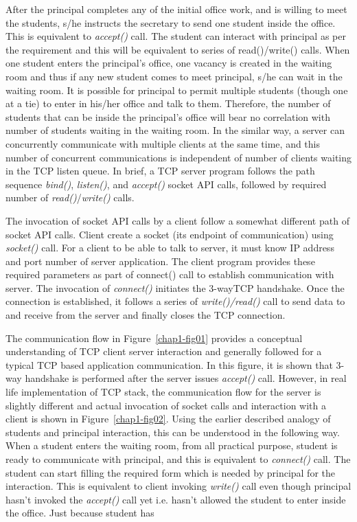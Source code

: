 \begin{multicols}{2}
After the principal completes any of the initial office work, and is willing to meet the students, s/he instructs the secretary to send one student inside the office. This is equivalent to \textit{accept()} call. The student can interact with principal as per the requirement and this will be equivalent to series of read()/write() calls. When one student enters the principal’s office, one vacancy is created in the waiting room and thus if any new student comes to meet principal, s/he can wait in the waiting room. It is possible for principal to permit multiple students (though one at a tie) to enter in his/her office and talk to them. Therefore, the number of students that can be inside the principal’s office will bear no correlation with number of students waiting in the waiting room. In the similar way, a server can concurrently communicate with multiple clients at the same time, and this number of concurrent communications is independent of number of clients waiting in the TCP listen queue. In brief, a TCP server program follows the path sequence \textit{bind()}, \textit{listen()}, and \textit{accept()} socket API calls, followed by required number of \textit{read()}/\textit{write()} calls. 

The invocation of socket API calls by a client follow a somewhat different path of socket API calls. Client create a socket (its endpoint of communication) using \textit{socket()} call. For a client to be able to talk to server, it must know IP address and port number of server application.  The client program provides these required parameters as part of connect() call to establish communication with server. The invocation of \textit{connect()} initiates the 3-wayTCP  handshake. Once the connection is established, it follows a series of \textit{write()/read()} call to send data to and receive from the server and finally closes the TCP connection.

The communication flow in Figure~\ref{chap1-fig01} provides a conceptual understanding of TCP client server interaction and generally followed for a typical TCP based application communication. In this figure, it is shown that 3-way handshake is performed after the server issues \textit{accept()} call. However, in real life implementation of TCP stack, the communication flow for the server is slightly different and actual invocation of socket calls and interaction with a client is shown in Figure~\ref{chap1-fig02}. Using the earlier described analogy of students and principal interaction, this can be understood in the following way. When a student enters the waiting room, from all practical purpose, student is ready to communicate with principal, and this is equivalent to \textit{connect()} call. The student can start filling the required form which is needed by principal for the interaction. This is equivalent to client invoking \textit{write()} call even though principal hasn’t invoked the \textit{accept()} call yet i.e. hasn’t allowed the student to enter inside the office. Just because student has 


\end{multicols}

